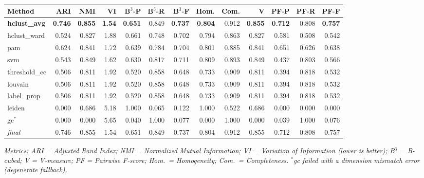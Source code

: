 \documentclass[11pt, a4paper]{article}
\begin{document}
\begin{table}[h!]
\centering
\small
\setlength{\tabcolsep}{4pt}
\begin{tabular}{lrrrrrrrrrrrr}
\toprule
\textbf{Method} & \textbf{ARI} & \textbf{NMI} & \textbf{VI} &
\textbf{B$^3$-P} & \textbf{B$^3$-R} & \textbf{B$^3$-F} &
\textbf{Hom.} & \textbf{Com.} & \textbf{V} &
\textbf{PF-P} & \textbf{PF-R} & \textbf{PF-F} \\
\midrule
\textbf{hclust\_avg}  & \textbf{0.746} & \textbf{0.855} & \textbf{1.54} & \textbf{0.651} & 0.849 & \textbf{0.737} & \textbf{0.804} & 0.912 & \textbf{0.855} & \textbf{0.712} & 0.808 & \textbf{0.757} \\
hclust\_ward         & 0.524 & 0.827 & 1.88 & 0.661 & 0.748 & 0.702 & 0.794 & 0.863 & 0.827 & 0.581 & 0.508 & 0.542 \\
pam                  & 0.624 & 0.841 & 1.72 & 0.639 & 0.784 & 0.704 & 0.801 & 0.885 & 0.841 & 0.651 & 0.626 & 0.638 \\
svm                  & 0.543 & 0.849 & 1.62 & 0.630 & 0.817 & 0.711 & 0.809 & 0.893 & 0.849 & 0.437 & 0.803 & 0.566 \\
threshold\_cc        & 0.506 & 0.811 & 1.92 & 0.520 & 0.858 & 0.648 & 0.733 & 0.909 & 0.811 & 0.394 & 0.818 & 0.532 \\
louvain              & 0.506 & 0.811 & 1.92 & 0.520 & 0.858 & 0.648 & 0.733 & 0.909 & 0.811 & 0.394 & 0.818 & 0.532 \\
label\_prop          & 0.506 & 0.811 & 1.92 & 0.520 & 0.858 & 0.648 & 0.733 & 0.909 & 0.811 & 0.394 & 0.818 & 0.532 \\
leiden               & 0.000 & 0.686 & 5.18 & 1.000 & 0.065 & 0.122 & 1.000 & 0.522 & 0.686 & 0.000 & 0.000 & 0.000 \\
gc$^*$               & 0.000 & 0.000 & 5.65 & 0.040 & 1.000 & 0.077 & 0.000 & 1.000 & 0.000 & 0.039 & 1.000 & 0.076 \\
\midrule
\textit{final}       & 0.746 & 0.855 & 1.54 & 0.651 & 0.849 & 0.737 & 0.804 & 0.912 & 0.855 & 0.712 & 0.808 & 0.757 \\
\bottomrule
\end{tabular}
\end{table}

\textit{Metrics: ARI = Adjusted Rand Index; NMI = Normalized Mutual Information;
VI = Variation of Information (lower is better); B$^3$ = B-cubed; V = V-measure;
PF = Pairwise F-score; Hom.\ = Homogeneity; Com.\ = Completeness.
$^*$gc failed with a dimension mismatch error (degenerate fallback).}
\end{document}
